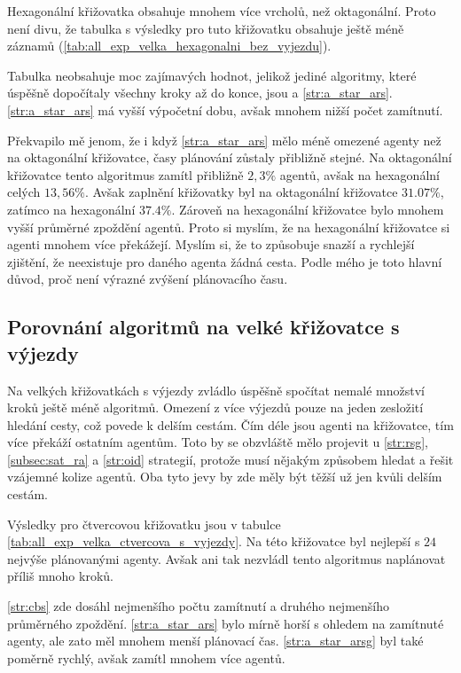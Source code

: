 Hexagonální křižovatka obsahuje mnohem více vrcholů, než oktagonální.
Proto není divu,
že tabulka s výsledky pro tuto křižovatku obsahuje ještě méně záznamů (\ref{tab:all_exp_velka_hexagonalni_bez_vyjezdu}).

Tabulka neobsahuje moc zajímavých hodnot, jelikož jediné algoritmy, které úspěšně dopočítaly všechny kroky až do konce,
jsou  a \ref{str:a_star_ars}.
\ref{str:a_star_ars} má vyšší výpočetní dobu, avšak mnohem nižší počet zamítnutí.

Překvapilo mě jenom, že i když \ref{str:a_star_ars} mělo méně omezené agenty než na oktagonální křižovatce,
časy plánování zůstaly přibližně stejné.
Na oktagonální křižovatce tento algoritmus zamítl přibližně $2,3\%$ agentů, avšak na hexagonální celých $13,56\%$.
Avšak zaplnění křižovatky byl na oktagonální křižovatce $31.07\%$, zatímco na hexagonální $37.4\%$.
Zároveň na hexagonální křižovatce bylo mnohem vyšší průměrné zpoždění agentů.
Proto si myslím, že na hexagonální křižovatce si agenti mnohem více překážejí.
Myslím si, že to způsobuje snazší a rychlejší zjištění, že neexistuje pro daného agenta žádná cesta.
Podle mého je toto hlavní důvod, proč není výrazné zvýšení plánovacího času.



\subsection{Porovnání algoritmů na velké křižovatce s výjezdy}
\label{subsec:porovnani_algoritmu_na_velke_krizovatce_s_vyjezdy}

Na velkých křižovatkách s výjezdy zvládlo úspěšně spočítat nemalé množství kroků ještě méně algoritmů.
Omezení z více výjezdů pouze na jeden zesložití hledání cesty, což povede k delším cestám.
Čím déle jsou agenti na křižovatce, tím více překáží ostatním agentům.
Toto by se obzvláště mělo projevit u \ref{str:rsg}, \ref{subsec:sat_ra} a \ref{str:oid} strategií,
protože musí nějakým způsobem hledat a řešit vzájemné kolize agentů.
Oba tyto jevy by zde měly být těžší už jen kvůli delším cestám.

Výsledky pro čtvercovou křižovatku jsou v tabulce \ref{tab:all_exp_velka_ctvercova_s_vyjezdy}.
Na této křižovatce byl  nejlepší s $24$ nejvýše plánovanými agenty.
Avšak ani tak nezvládl tento algoritmus naplánovat příliš mnoho kroků.

\ref{str:cbs} zde dosáhl nejmenšího počtu zamítnutí a druhého nejmenšího průměrného zpoždění.
\ref{str:a_star_ars} bylo mírně horší s ohledem na zamítnuté agenty, ale zato měl mnohem menší plánovací čas.
\ref{str:a_star_arsg} byl také poměrně rychlý, avšak zamítl mnohem více agentů.

